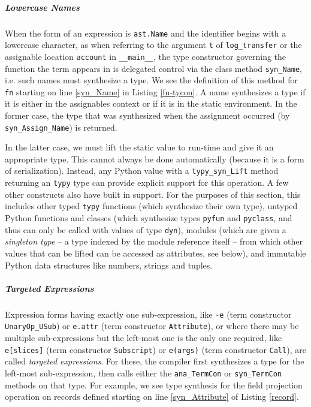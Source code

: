 \documentclass{sigplanconf}
\newcommand{\lip}[1]{\lstinline[language=Python,basicstyle=\ttfamily\small,deletendkeywords={tuple,buffer,map}]{#1}}
\begin{document}
\subparagraph{Lowercase Names} When the form of an expression is \lip{ast.Name} and the identifier begins with a lowercase character, as when referring to the argument \lip{t} of \lip{log_transfer} or the assignable location \lip{account} in \lip{__main__}, the type constructor governing the function the term appears in is delegated control  via the class method \lip{syn_Name}, i.e. such names must synthesize a type. We see the definition of this method for \lip{fn} starting on line \ref{syn_Name} in Listing \ref{fn-tycon}. A name synthesizes a type if it is either in the assignables context or if it is in the static environment. In the former case, the type that was synthesized when the assignment occurred (by \lip{syn_Assign_Name}) is returned. 

In the latter case, we must lift the static value to run-time and give it an appropriate type. This cannot always be done automatically (because it is a form of serialization). Instead, any Python value with a \lip{typy_syn_Lift} method returning an \lip{typy} type can provide explicit support for this operation. A few other constructs also have built in support. For the purposes of this section, this includes other typed \texttt{typy} functions (which synthesize their own type), untyped Python functions and classes (which synthesize types \lip{pyfun} and \lip{pyclass}, and thus can only be called with values of type \lip{dyn}), modules (which are given a \emph{singleton type} -- a type indexed by the module reference itself -- from which other values that can be lifted can be accessed as attributes, see below), and immutable Python data structures like numbers, strings and tuples. %


\subparagraph{Targeted Expressions} Expression forms having exactly one sub-expression, like \lip{-e} (term constructor \lip{UnaryOp_USub}) or \lip{e.attr} (term constructor \lip{Attribute}), or where there may be multiple sub-expressions but the left-most one is the only one required, like \lip{e[slices]} (term constructor  \lip{Subscript}) or \lip{e(args)} (term constructor \lip{Call}), are called \emph{targeted expressions}. For these, the compiler first synthesizes a type for the left-most sub-expression, then calls either the \lip{ana_TermCon} or \lip{syn_TermCon} methods on that type. For example, we see type synthesis for the field projection operation on records defined starting on line \ref{syn_Attribute} of Listing \ref{record}.%
\end{document}
